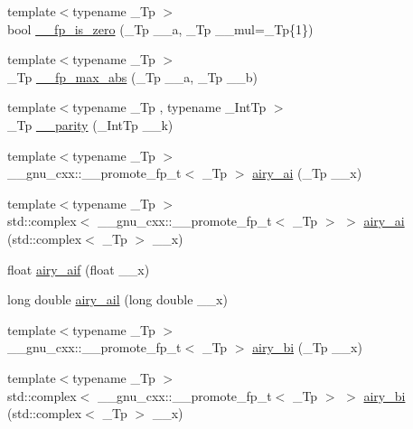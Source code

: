 \begin{DoxyCompactItemize}
\item 
{\footnotesize template$<$typename \+\_\+\+Tp $>$ }\\bool \hyperlink{namespace____gnu__cxx_a8d30fc0f2348283e00f56c16d5713fc9}{\+\_\+\+\_\+fp\+\_\+is\+\_\+zero} (\+\_\+\+Tp \+\_\+\+\_\+a, \+\_\+\+Tp \+\_\+\+\_\+mul=\+\_\+\+Tp\{1\})
\item 
{\footnotesize template$<$typename \+\_\+\+Tp $>$ }\\\+\_\+\+Tp \hyperlink{namespace____gnu__cxx_adebbf99919675806def929327e724a53}{\+\_\+\+\_\+fp\+\_\+max\+\_\+abs} (\+\_\+\+Tp \+\_\+\+\_\+a, \+\_\+\+Tp \+\_\+\+\_\+b)
\item 
{\footnotesize template$<$typename \+\_\+\+Tp , typename \+\_\+\+Int\+Tp $>$ }\\\+\_\+\+Tp \hyperlink{namespace____gnu__cxx_abc155473831db12736006150c0ad42b6}{\+\_\+\+\_\+parity} (\+\_\+\+Int\+Tp \+\_\+\+\_\+k)
\item 
{\footnotesize template$<$typename \+\_\+\+Tp $>$ }\\\+\_\+\+\_\+gnu\+\_\+cxx\+::\+\_\+\+\_\+promote\+\_\+fp\+\_\+t$<$ \+\_\+\+Tp $>$ \hyperlink{group__gnu__math__spec__func_ga53243cdb83abeb008fa90d8a098768af}{airy\+\_\+ai} (\+\_\+\+Tp \+\_\+\+\_\+x)
\item 
{\footnotesize template$<$typename \+\_\+\+Tp $>$ }\\std\+::complex$<$ \+\_\+\+\_\+gnu\+\_\+cxx\+::\+\_\+\+\_\+promote\+\_\+fp\+\_\+t$<$ \+\_\+\+Tp $>$ $>$ \hyperlink{group__gnu__math__spec__func_gab61dcd6c20c602711544b39d2429038b}{airy\+\_\+ai} (std\+::complex$<$ \+\_\+\+Tp $>$ \+\_\+\+\_\+x)
\item 
float \hyperlink{group__gnu__math__spec__func_gaf317ba724c44b3a8271fe341d9870173}{airy\+\_\+aif} (float \+\_\+\+\_\+x)
\item 
long double \hyperlink{group__gnu__math__spec__func_ga800fdb61c672ae1831f4ca4250d657de}{airy\+\_\+ail} (long double \+\_\+\+\_\+x)
\item 
{\footnotesize template$<$typename \+\_\+\+Tp $>$ }\\\+\_\+\+\_\+gnu\+\_\+cxx\+::\+\_\+\+\_\+promote\+\_\+fp\+\_\+t$<$ \+\_\+\+Tp $>$ \hyperlink{group__gnu__math__spec__func_ga812ca309bff1b0ae2bbe1183a0bc47d5}{airy\+\_\+bi} (\+\_\+\+Tp \+\_\+\+\_\+x)
\item 
{\footnotesize template$<$typename \+\_\+\+Tp $>$ }\\std\+::complex$<$ \+\_\+\+\_\+gnu\+\_\+cxx\+::\+\_\+\+\_\+promote\+\_\+fp\+\_\+t$<$ \+\_\+\+Tp $>$ $>$ \hyperlink{group__gnu__math__spec__func_ga6dee14118a9bc3ccfa6f1d2b96b4be10}{airy\+\_\+bi} (std\+::complex$<$ \+\_\+\+Tp $>$ \+\_\+\+\_\+x)

\end{DoxyCompactItemize}
